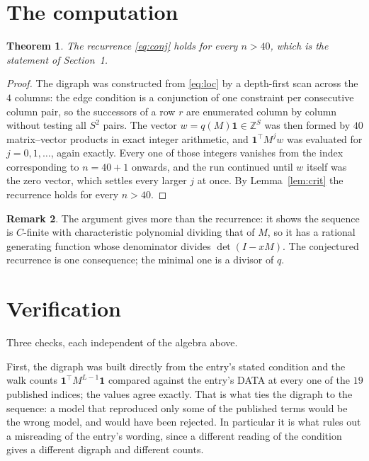 \documentclass[11pt,a4paper]{article}
\theoremstyle{plain}
\newtheorem{theorem}{Theorem}
\theoremstyle{definition}
\newtheorem{remark}[theorem]{Remark}
\begin{document}
\section{The computation}

\begin{theorem}
The recurrence \eqref{eq:conj} holds for every $n>40$, which is the statement of
Section~1.
\end{theorem}

\begin{proof}
The digraph was constructed from \eqref{eq:loc} by a depth-first scan across the $4$
columns: the edge condition is a conjunction of one constraint per consecutive column
pair, so the successors of a row $r$ are enumerated column by column without testing all
$S^2$ pairs. The vector $w=q(M)\mathbf{1}\in\mathbb{Z}^{S}$ was then formed by $40$
matrix--vector products in exact integer arithmetic, and $\mathbf{1}^{\!\top}M^{j}w$ was
evaluated for $j=0,1,\dots$, again exactly. Every one of those integers vanishes from the
index corresponding to $n=40+1$ onwards, and the run continued until $w$ itself was the
zero vector, which settles every larger $j$ at once. By Lemma~\ref{lem:crit} the recurrence
holds for every $n>40$.
\end{proof}

\begin{remark}
The argument gives more than the recurrence: it shows the sequence is $C$-finite with
characteristic polynomial dividing that of $M$, so it has a rational generating function
whose denominator divides $\det(I-xM)$. The conjectured recurrence is one consequence; the
minimal one is a divisor of $q$.
\end{remark}

\section{Verification}

Three checks, each independent of the algebra above.

First, the digraph was built directly from the entry's stated condition and the walk counts
$\mathbf{1}^{\!\top}M^{L-1}\mathbf{1}$ compared against the entry's DATA at
every one of the $19$ published indices; the values agree exactly. That is what ties
the digraph to the sequence: a model that reproduced only some of the published terms would
be the wrong model, and would have been rejected. In particular it is what rules out a
misreading of the entry's wording, since a different reading of the condition gives a
different digraph and different counts.
\end{document}
